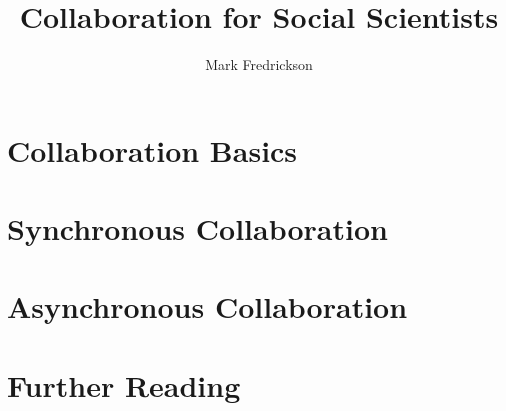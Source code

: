 \documentclass[]{article}
\author{Mark Fredrickson} %
\title{Collaboration for Social Scientists}
\begin{document}
\maketitle

\section{Collaboration Basics}

\section{Synchronous Collaboration}

\section{Asynchronous Collaboration}

\section{Further Reading}

\end{document}
